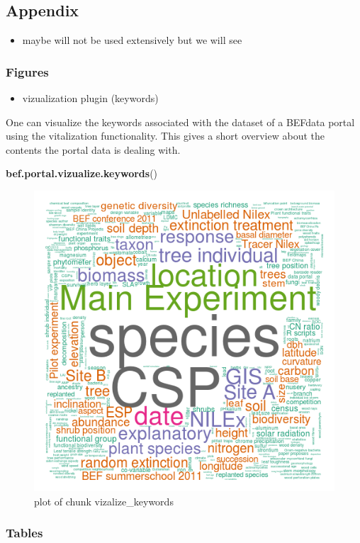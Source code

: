 \documentclass[]{article}
\makeatletter
\newenvironment{Shaded}{}{}
\newcommand{\KeywordTok}[1]{\textcolor[rgb]{0.00,0.44,0.13}{\textbf{{#1}}}}
\newcommand{\NormalTok}[1]{{#1}}
\def\maxwidth{\ifdim\Gin@nat@width>\linewidth\linewidth
\else\Gin@nat@width\fi}
\let\Oldincludegraphics\includegraphics
\renewcommand{\includegraphics}[1]{\Oldincludegraphics[width=\maxwidth]{#1}}
\makeatother
\begin{document}
\subsection{Appendix}

\begin{itemize}
\itemsep1pt\parskip0pt
\item
  maybe will not be used extensively but we will see
\end{itemize}

\subsubsection{Figures}

\begin{itemize}
\itemsep1pt\parskip0pt
\item
  vizualization plugin (keywords)
\end{itemize}

One can visualize the keywords associated with the dataset of a BEFdata
portal using the vitalization functionality. This gives a short overview
about the contents the portal data is dealing with.

\begin{Shaded}
\begin{Highlighting}[]
\KeywordTok{bef.portal.vizualize.keywords}\NormalTok{()}
\end{Highlighting}
\end{Shaded}

\begin{figure}[htbp]
\centering
\includegraphics{figure/vizalize_keywords.png}
\caption{plot of chunk vizalize\_keywords}
\end{figure}

\subsubsection{Tables}
\end{document}

